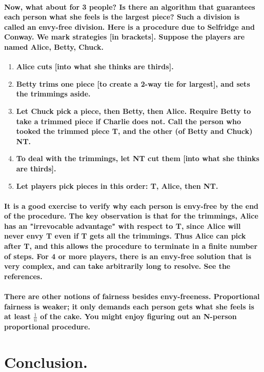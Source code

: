 \documentclass[12pt]{report}
\begin{document}
	\paragraph{Now, what about for 3 people? Is there an algorithm that guarantees each person what she feels is the largest piece? Such a division is called an envy-free division. Here is a procedure due to Selfridge and Conway. We mark strategies [in brackets]. Suppose the players are named Alice, Betty, Chuck.}
	\begin{enumerate}
		\item \textbf{Alice cuts [into what she thinks are thirds].}
		\item \textbf{Betty trims one piece [to create a 2-way tie for largest], and sets the trimmings aside.}
		\item \textbf{Let Chuck pick a piece, then Betty, then Alice. Require Betty to take a trimmed piece if Charlie does not. Call the person who tooked the trimmed piece T, and the other (of Betty and Chuck) NT.}
		\item \textbf{To deal with the trimmings, let NT cut them [into what she thinks are thirds].}
		\item \textbf{Let players pick pieces in this order: T, Alice, then NT.}
	\end{enumerate}
	\paragraph{It is a good exercise to verify why each person is envy-free by the end of the procedure. The key observation is that for the trimmings, Alice has an "irrevocable advantage" with respect to T, since Alice will never envy T even if T gets all the trimmings. Thus Alice can pick after T, and this allows the procedure to terminate in a finite number of steps. For 4 or more players, there is an envy-free solution that is very complex, and can take arbitrarily long to resolve. See the references.}
	\paragraph{There are other notions of fairness besides envy-freeness. Proportional fairness is weaker; it only demands each person gets what she feels is at least 
		$\frac{1}{n}$ of the cake. You might enjoy figuring out an N-person proportional procedure.}
	\section{Conclusion.}
	
\end{document}

